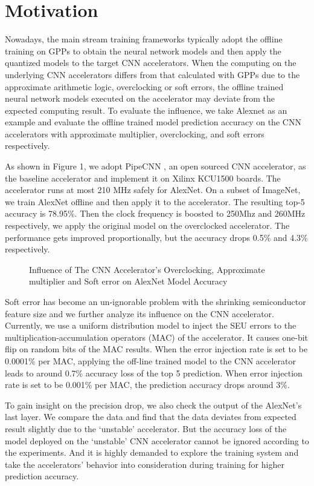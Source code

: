 \section{Motivation} \label{sec:motivation}
Nowadays, the main stream training frameworks typically adopt the offline training
on GPPs to obtain the neural network models and then apply the quantized models to the 
target CNN accelerators. When the computing on the underlying CNN accelerators differs
from that calculated with GPPs due to the approximate arithmetic logic, overclocking or 
soft errors, the offline trained neural network models executed on the accelerator 
may deviate from the expected computing result. To evaluate the influence, 
we take Alexnet as an example and evaluate the offline trained model prediction 
accuracy on the CNN accelerators with approximate multiplier, 
overclocking, and soft errors respectively. 


  As shown in Figure 1, we adopt PipeCNN\cite{pipecnn_2} , an open sourced CNN accelerator, 
as the baseline accelerator and implement it on Xilinx KCU1500 boards. The accelerator 
runs at most 210 MHz safely for AlexNet. On a subset of ImageNet, we train AlexNet offline 
and then apply it to the accelerator. The resulting top-5 accuracy is 78.95\%. Then the clock 
frequency is boosted to 250Mhz and 260MHz respectively, we apply the original model on 
the overclocked accelerator. The performance gets improved proportionally, but the 
accuracy drops 0.5\% and 4.3\% respectively.

\begin{figure}
        \caption{Influence of The CNN Accelerator’s Overclocking, Approximate multiplier and Soft error on AlexNet Model Accuracy}
        \label{fig:retrain}
\end{figure}

  Soft error has become an un-ignorable problem with the shrinking semiconductor 
feature size and we further analyze its influence on the CNN accelerator. 
Currently, we use a uniform distribution model to inject the SEU errors to the 
multiplication-accumulation operators (MAC) of the accelerator. It causes one-bit 
flip on random bits of the MAC results. When the error injection rate is set to 
be 0.0001\% per MAC, applying the off-line trained model to the CNN accelerator 
leads to around 0.7\% accuracy loss of the top 5 prediction. When error injection 
rate is set to be 0.001\% per MAC, the prediction accuracy drops around 3\%.

  To gain insight on the precision drop, we also check the output of the AlexNet’s last 
layer. We compare the data and find that the data deviates from expected result slightly 
due to the ‘unstable’ accelerator. But the accuracy loss of the model deployed on 
the ‘unstable’ CNN accelerator cannot be ignored according to the experiments. 
And it is highly demanded to explore the training 
system and take the accelerators’ behavior into consideration during training for higher prediction accuracy.


